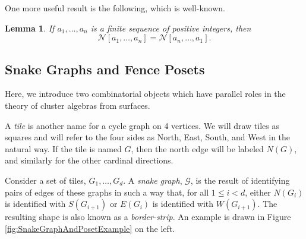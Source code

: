 \documentclass[12pt, letterpaper,table]{amsart}
\newtheorem{lemma}[theorem]{Lemma}
\theoremstyle{remark}
\begin{document}
One more useful result is the following, which is well-known.

\begin{lemma}\label{lem:Reverse}
If $a_1,\ldots,a_n$ is a finite sequence of positive integers, then \[
\mathcal{N}[a_1,\ldots,a_n] = \mathcal{N}[a_n,\ldots,a_1].
\]
\end{lemma}

\subsection{Snake Graphs and Fence Posets}

Here, we introduce two combinatorial objects which have parallel roles in the theory of cluster algebras from surfaces. 

A \emph{tile} is another name for a cycle graph on 4 vertices. We will draw tiles as squares and will refer to the four sides as North, East, South, and West in the natural way. If the tile is named $G$, then the north edge will be labeled $N(G)$, and similarly for the other cardinal directions.

Consider a set of tiles, $G_1,\ldots,G_d$. A \emph{snake graph}, $\mathcal{G}$, is the result of identifying pairs of edges of these graphs in such a way that, for all $1 \leq i < d$, either $N(G_i)$ is identified with $S(G_{i+1})$ or $E(G_i)$ is identified with $W(G_{i+1})$. The resulting shape is also known as a \emph{border-strip}. An example is drawn in Figure \ref{fig:SnakeGraphAndPosetExample} on the left. 
\end{document}
